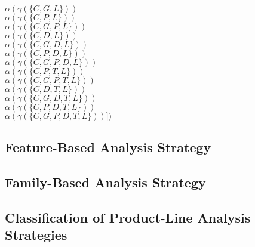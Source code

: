 \begin{frame}{\myframetitle}
\begin{mycolumns}
{{			}{
				$\alpha(\gamma(\{C,G,L\}))$\\
				$\alpha(\gamma(\{C,P,L\}))$\\
				$\alpha(\gamma(\{C,G,P,L\}))$\\
				$\alpha(\gamma(\{C,D,L\}))$\\
				$\alpha(\gamma(\{C,G,D,L\}))$\\
				$\alpha(\gamma(\{C,P,D,L\}))$\\
				$\alpha(\gamma(\{C,G,P,D,L\}))$\\
				$\alpha(\gamma(\{C,P,T,L\}))$\\
				$\alpha(\gamma(\{C,G,P,T,L\}))$\\
				$\alpha(\gamma(\{C,D,T,L\}))$\\
				$\alpha(\gamma(\{C,G,D,T,L\}))$\\
				$\alpha(\gamma(\{C,P,D,T,L\}))$\\
				$\alpha(\gamma(\{C,G,P,D,T,L\}))])$
			}
		}
	\end{mycolumns}
\end{frame}


\subsection{Feature-Based Analysis Strategy}

\begin{frame}{\myframetitle}
	
\end{frame}

\subsection{Family-Based Analysis Strategy}

\begin{frame}{\myframetitle}
	
\end{frame}

\subsection{Classification of Product-Line Analysis Strategies}

\begin{frame}{\myframetitle}
	\begin{mycolumns}[columns=3]

	\mynextcolumn
	
	\mynextcolumn

\end{mycolumns}
\end{frame}

